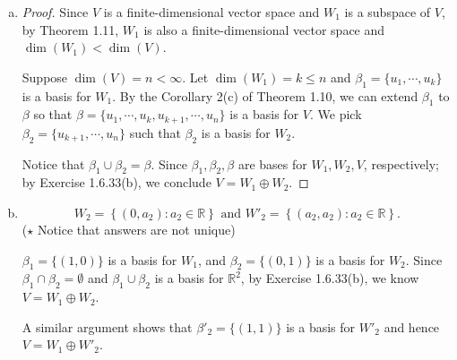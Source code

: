 \begin{Exercise}
	\begin{enumerate}[(a)]
		\item
		\begin{proof}
			Since $V$ is a finite-dimensional vector space and $W_1$ is a subspace of $V$, by Theorem 1.11, $W_1$ is also a finite-dimensional vector space and $\dim(W_1) < \dim(V)$.
			
			Suppose $\dim(V) = n < \infty$. Let $\dim(W_1) = k \leq n$ and $\beta_1 = \{u_1, \cdots, u_k\}$ is a basis for $W_1$. By the Corollary 2(c) of Theorem 1.10, we can extend $\beta_1$ to $\beta$ so that $\beta = \{u_1,\cdots,u_k,u_{k+1},\cdots,u_n\}$ is a basis for $V$. We pick $\beta_2 = \{u_{k+1},\cdots,u_n\}$ such that $\beta_2$ is a basis for $W_2$.
			
			Notice that $\beta_1\cup\beta_2 = \beta$. Since $\beta_1,\beta_2,\beta$ are bases for $W_1,W_2,V$, respectively; by Exercise 1.6.33(b), we conclude $V=W_1\oplus W_2$.
		\end{proof}
		
		\item
		\begin{answer}
			$$
			W_2 = \left\{ (0,a_2):a_2\in\mathbb{R} \right\}\text{ and }
			W'_2 = \left\{ (a_2,a_2):a_2\in\mathbb{R} \right\}.
			$$
			($\star$ Notice that answers are not unique)
		\end{answer}
		\begin{solution}
			$\beta_1 = \{(1,0)\}$ is a basis for $W_1$, and $\beta_2 = \{(0,1)\}$ is a basis for $W_2$. Since $\beta_1\cap\beta_2 =\emptyset$ and $\beta_1\cup\beta_2$ is a basis for $\mathbb{R}^2$, by Exercise 1.6.33(b), we know $V=W_1\oplus W_2$. 
			
			A similar argument shows that $\beta'_2 = \{(1,1)\}$ is a basis for $W'_2$ and hence $V=W_1\oplus W'_2$.
		\end{solution}
	\end{enumerate}
\end{Exercise}
